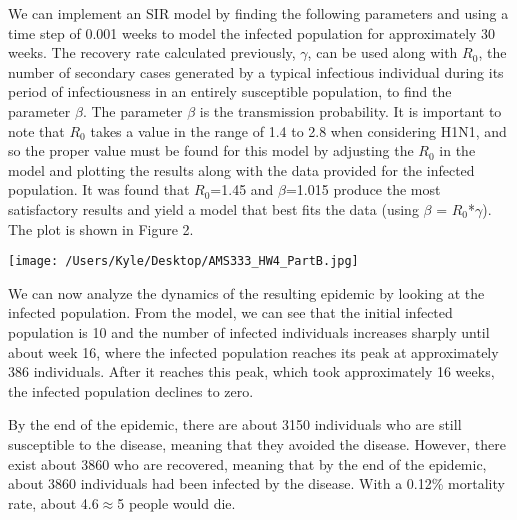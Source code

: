 \documentclass[12pt]{article}
\begin{document}
We can implement an SIR model by finding the following parameters and using a time step of 0.001 weeks to model the infected population for approximately 30 weeks. The recovery rate calculated previously, ${\gamma}$, can be used along with $R_0$, the number of secondary cases generated by a typical infectious individual during its period of infectiousness in an entirely susceptible population, to find the parameter ${\beta}$. The parameter ${\beta}$ is the transmission probability. It is important to note that $R_0$ takes a value in the range of 1.4 to 2.8 when considering H1N1, and so the proper value must be found for this model by adjusting the $R_0$ in the model and plotting the results along with the data provided for the infected population. It was found that $R_0$=1.45 and ${\beta}$=1.015 produce the most satisfactory results and yield a model that best fits the data (using ${\beta}$ = $R_0$*${\gamma}$). The plot is shown in Figure 2.
\begin{center}
   \texttt{[image: /Users/Kyle/Desktop/AMS333\_HW4\_PartB.jpg]}
\end{center}

We can now analyze the dynamics of the resulting epidemic by looking at the infected population. From the model, we can see that the initial infected population is 10 and the number of infected individuals increases sharply until about week 16, where the infected population reaches its peak at approximately 386 individuals. After it reaches this peak, which took approximately 16 weeks, the infected population declines to zero. 

By the end of the epidemic, there are about 3150 individuals who are still susceptible to the disease, meaning that they avoided the disease. However, there exist about 3860 who are recovered, meaning that by the end of the epidemic, about 3860 individuals had been infected by the disease. With a 0.12\% mortality rate, about 4.6$\approx$5 people would die.

\end{document}
